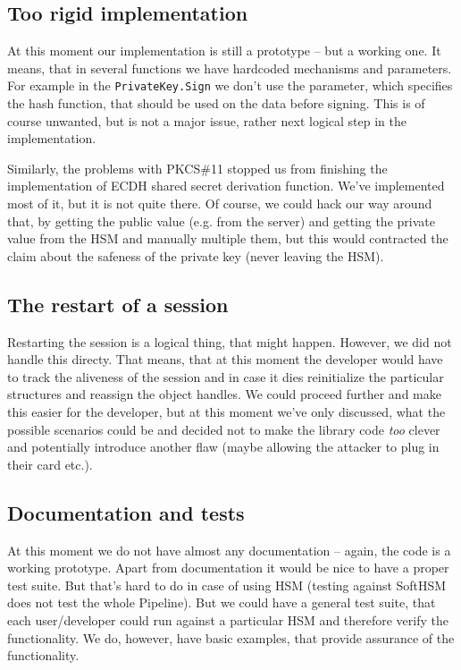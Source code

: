 \documentclass[a4paper]{scrartcl}
\begin{document}
\subsection{Too rigid implementation}
At this moment our implementation is still a prototype -- but a working one. It means, that in several functions we have hardcoded mechanisms and parameters. For example in the \lstinline[columns=fixed]{PrivateKey.Sign} we don't use the parameter, which specifies the hash function, that should be used on the data before signing. This is of course unwanted, but is not a major issue, rather next logical step in the implementation.

Similarly, the problems with PKCS\#11 stopped us from finishing the implementation of ECDH shared secret derivation function. We've implemented most of it, but it is not quite there. Of course, we could hack our way around that, by getting the public value (e.g. from the server) and getting the private value from the HSM and manually multiple them, but this would contracted the claim about the safeness of the private key (never leaving the HSM).

\subsection{The restart of a session}
Restarting the session is a logical thing, that might happen. However, we did not handle this directy. That means, that at this moment the developer would have to track the aliveness of the session and in case it dies reinitialize the particular structures and reassign the object handles. We could proceed further and make this easier for the developer, but at this moment we've only discussed, what the possible scenarios could be and decided not to make the library code \textit{too} clever and potentially introduce another flaw (maybe allowing the attacker to plug in their card etc.).

\subsection{Documentation and tests}
At this moment we do not have almost any documentation -- again, the code is a working prototype. Apart from documentation it would be nice to have a proper test suite. But that's hard to do in case of using HSM (testing against SoftHSM does not test the whole Pipeline). But we could have a general test suite, that each user/developer could run against a particular HSM and therefore verify the functionality. We do, however, have basic examples, that provide assurance of the functionality.
\end{document}
